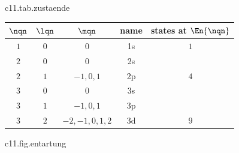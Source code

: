 \begin{tpctable}{c11.tab.zustaende}
  \caption{The states of the relative motion up to $\nqn = 3$. The letters s, p, d stand
    for $\lqn = 0, 1, 2$; the last column gives the number of states of equal energy
    according to \eqref{c11.eq.entartung}. Spin is not counted.}
  \begin{tabular}{ccccc}
    \toprule
    $\nqn$ & $\lqn$ & $\mqn$ & name & states at $\En{\nqn}$ \\
    \midrule
    $1$ & $0$ & $0$ & 1s & $1$ \\
    \midrule
    $2$ & $0$ & $0$ & 2s & \\
    $2$ & $1$ & $-1, 0, 1$ & 2p & $4$ \\
    \midrule
    $3$ & $0$ & $0$ & 3s & \\
    $3$ & $1$ & $-1, 0, 1$ & 3p & \\
    $3$ & $2$ & $-2, -1, 0, 1, 2$ & 3d & $9$ \\
    \bottomrule
  \end{tabular}
\end{tpctable}

\begin{tpcfigure}{c11.fig.entartung}
  \caption{The same states as in Table~\ref{c11.tab.zustaende}, sorted by $\nqn$ and $\lqn$, for $\Znuc = 1$. Each short stroke is one state; its height is the energy $\En{\nqn}$ in units of $\RydRed$. Strokes at the same height have the same energy, whichever column they stand in. On the right is their number $\nqn^2$.}
\end{tpcfigure}


